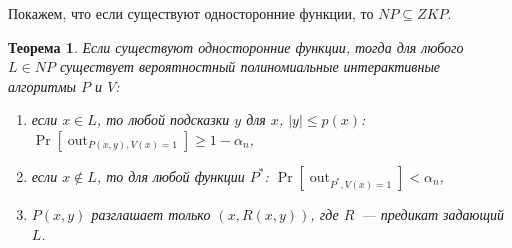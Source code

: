\documentclass[12pt,a4paper]{article}
\DeclareMathOperator{\out}{out}
\theoremstyle{definition}
\theoremstyle{plain}
\newtheorem{theorem}{Теорема}[section]
\theoremstyle{remark}
\begin{document}
Покажем, что если существуют односторонние функции, то $NP\subseteq ZKP$.

\begin{theorem}
Если существуют односторонние функции, тогда для любого $L\in NP$ существует 
вероятностный полиномиальные интерактивные
алгоритмы $P$ и $V$:
\begin{enumerate}
\item если $x\in L$, то любой подсказки $y$ для $x$, $|y|\le p(x)$: $\Pr[\out_{P(x, y), V(x) = 1}]\ge 1-\alpha_n$,
\item если $x\not\in L$, то для любой функции $P^*$: $\Pr[\out_{P^*, V(x) = 1}] < \alpha_n$,
\item $P(x, y)$ разглашает только $(x, R(x,y))$, где $R$~--- предикат задающий $L$.
\end{enumerate}
\end{theorem}
\end{document}
